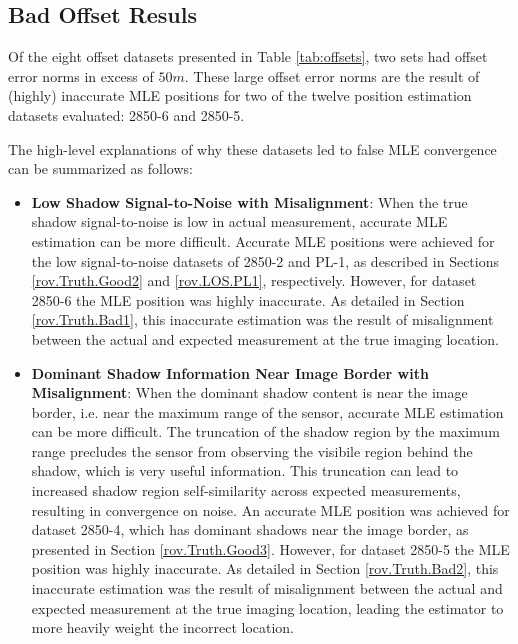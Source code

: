 \subsection{Bad Offset Resuls}
\label{rov.Truth.Bad}

Of the eight offset datasets presented in Table \ref{tab:offsets}, two sets had offset error norms in excess of $50m$.
These large offset error norms are the result of (highly) inaccurate MLE positions for two of the twelve position estimation datasets evaluated: 2850-6 and 2850-5.

The high-level explanations of why these datasets led to false MLE convergence can be summarized as follows:

\begin{itemize}

\item \textbf{Low Shadow Signal-to-Noise with Misalignment}: When the true shadow signal-to-noise is low in actual measurement, accurate MLE estimation can be more difficult.  Accurate MLE positions were achieved for the low signal-to-noise datasets of 2850-2 and PL-1, as described in Sections \ref{rov.Truth.Good2} and \ref{rov.LOS.PL1}, respectively.  However, for dataset 2850-6 the MLE position was highly inaccurate.  As detailed in Section \ref{rov.Truth.Bad1}, this inaccurate estimation was the result of misalignment between the actual and expected measurement at the true imaging location.

\item \textbf{Dominant Shadow Information Near Image Border with Misalignment}: When the dominant shadow content is near the image border, i.e. near the maximum range of the sensor, accurate MLE estimation can be more difficult.  The truncation of the shadow region by the maximum range precludes the sensor from observing the visibile region behind the shadow, which is very useful information.  This truncation can lead to increased shadow region self-similarity across expected measurements, resulting in convergence on noise.  An accurate MLE position was achieved for dataset 2850-4, which has dominant shadows near the image border, as presented in Section \ref{rov.Truth.Good3}.  However, for dataset 2850-5 the MLE position was highly inaccurate.  As detailed in Section \ref{rov.Truth.Bad2}, this inaccurate estimation was the result of misalignment between the actual and expected measurement at the true imaging location, leading the estimator to more heavily weight the incorrect location.

\end{itemize}

